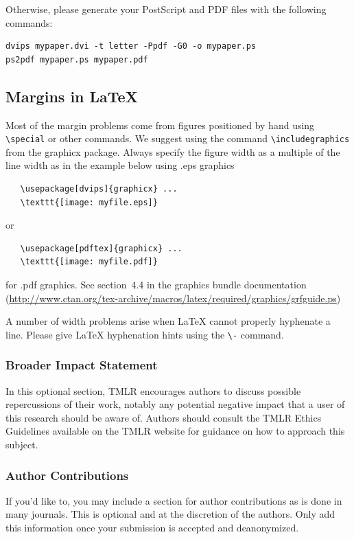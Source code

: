 \documentclass[10pt]{article} %
\begin{document}
Otherwise, please generate your PostScript and PDF files with the following commands:
\begin{verbatim}
dvips mypaper.dvi -t letter -Ppdf -G0 -o mypaper.ps
ps2pdf mypaper.ps mypaper.pdf
\end{verbatim}

\subsection{Margins in LaTeX}

Most of the margin problems come from figures positioned by hand using
\verb+\special+ or other commands. We suggest using the command
\verb+\includegraphics+
from the graphicx package. Always specify the figure width as a multiple of
the line width as in the example below using .eps graphics
\begin{verbatim}
   \usepackage[dvips]{graphicx} ...
   \texttt{[image: myfile.eps]}
\end{verbatim}
or %
\begin{verbatim}
   \usepackage[pdftex]{graphicx} ...
   \texttt{[image: myfile.pdf]}
\end{verbatim}
for .pdf graphics.
See section~4.4 in the graphics bundle documentation (\url{http://www.ctan.org/tex-archive/macros/latex/required/graphics/grfguide.ps})

A number of width problems arise when LaTeX cannot properly hyphenate a
line. Please give LaTeX hyphenation hints using the \verb+\-+ command.

\subsubsection*{Broader Impact Statement}
In this optional section, TMLR encourages authors to discuss possible repercussions of their work,
notably any potential negative impact that a user of this research should be aware of. 
Authors should consult the TMLR Ethics Guidelines available on the TMLR website
for guidance on how to approach this subject.

\subsubsection*{Author Contributions}
If you'd like to, you may include a section for author contributions as is done
in many journals. This is optional and at the discretion of the authors. Only add
this information once your submission is accepted and deanonymized. 
\end{document}
